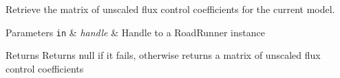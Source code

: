 Retrieve the matrix of unscaled flux control coefficients for the current model. 


\begin{DoxyParams}[1]{Parameters}
\mbox{\tt in}  & {\em handle} & Handle to a Road\+Runner instance \\
\hline
\end{DoxyParams}
\begin{DoxyReturn}{Returns}
Returns null if it fails, otherwise returns a matrix of unscaled flux control coefficients 
\end{DoxyReturn}
